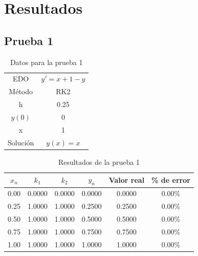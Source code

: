 \documentclass[article, 11pt]{IEEEtran}   %
\begin{document}
\section {Resultados}
\subsection{Prueba 1}
\begin{table}[H]
\centering
\caption{Datos para la prueba 1}
\label{DataTable1}
\begin{tabular}{|c|c|}
\hline
EDO & $y\prime=x+1-y$\\
Método & RK2\\
h & 0.25\\  
$y(0)$ & 0\\
x & 1\\
Solución & $y(x)=x$\\
\hline   
\end{tabular}
\end{table}

\begin{table}[H]
\centering
\caption{Resultados de la prueba 1}
\label{DataTable2}
\begin{tabular}{|c|c|c|c|c|c|}
\hline
$x_n$ & $k_1$ & $k_2$ & $y_n$ & Valor real & \% de error \\
\hline
0.00 & 0.0000 & 0.0000 & 0.0000 & 0.0000 & 0.00\%\\
0.25 & 1.0000 & 1.0000 & 0.2500 & 0.2500 & 0.00\%\\
0.50 & 1.0000 & 1.0000 & 0.5000 & 0.5000 & 0.00\%\\
0.75 & 1.0000 & 1.0000 & 0.7500 & 0.7500 & 0.00\%\\
1.00 & 1.0000 & 1.0000 & 1.0000 & 1.0000 & 0.00\%\\
\hline   
\end{tabular}
\end{table}
\end{document}
